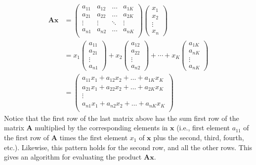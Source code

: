 \documentclass[
]{book}
\theoremstyle{definition}
\theoremstyle{definition}
\theoremstyle{definition}
\theoremstyle{definition}
\theoremstyle{remark}
\begin{document}
\[
\begin{aligned}
\mathbf{A}  \mathbf{x} & = \begin{pmatrix}
a_{11} & a_{12} & \ldots & a_{1K} \\
a_{21} & a_{22} & \ldots & a_{2K} \\
\vdots & \vdots & \ddots & \vdots \\
a_{n1} & a_{n2} & \ldots & a_{nK} \\
\end{pmatrix} \begin{pmatrix} x_1 \\ x_2 \\ \vdots \\ x_n \end{pmatrix} \\
& = x_1\begin{pmatrix}
a_{11} \\ a_{21} \\ \vdots \\ a_{n1} 
\end{pmatrix} +
x_2 \begin{pmatrix}
a_{12} \\ a_{22} \\ \vdots \\ a_{n2} 
\end{pmatrix} +
\cdots + x_K \begin{pmatrix}
a_{1K} \\ a_{nK} \\ \vdots \\ a_{nK} \end{pmatrix} \\
& =  \begin{pmatrix}
a_{11} x_1 + a_{12} x_2 + \ldots + a_{1K} x_K \\
a_{21} x_1 + a_{22} x_2 + \ldots + a_{2K} x_K \\
\vdots \\
a_{n1} x_1 + a_{n2} x_2 + \ldots + a_{nK} x_K \\
\end{pmatrix}
\end{aligned}
\]
Notice that the first row of the last matrix above has the sum first row of the matrix \(\mathbf{A}\) multiplied by the corresponding elements in \(\mathbf{x}\) (i.e., first element \(a_{11}\) of the first row of \(\mathbf{A}\) times the first element \(x_1\) of \(\mathbf{x}\) plus the second, third, fourth, etc.). Likewise, this pattern holds for the second row, and all the other rows. This gives an algorithm for evaluating the product \(\mathbf{A} \mathbf{x}\).
\end{document}
